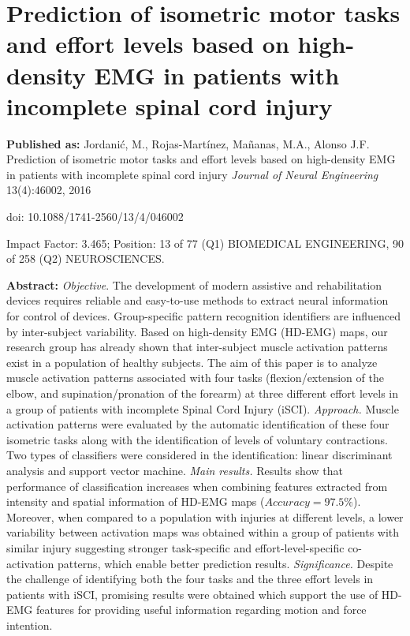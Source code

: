 \chapter[Myoelectric patterns within the group of patients with iSCI]{Prediction of isometric motor tasks and effort levels based on high-density EMG in patients with incomplete spinal cord injury}
\label{ch:p2}
\textbf{Published as:} 
Jordanić, M., Rojas-Martínez,  Ma\~nanas, M.A., Alonso J.F.
Prediction of isometric motor tasks and effort levels based on high-density EMG in patients with incomplete spinal cord injury \textit{Journal of Neural Engineering} 13(4):46002, 2016

doi: 10.1088/1741-2560/13/4/046002

Impact Factor: 3.465; Position: 13 of 77 (Q1) BIOMEDICAL ENGINEERING, 90 of 258 (Q2) NEUROSCIENCES.


\textbf{Abstract:} \textit{Objective}. The development of modern assistive and rehabilitation devices requires reliable and easy-to-use methods to extract neural information for control of devices. Group-specific pattern recognition identifiers are influenced by inter-subject variability. Based on high-density EMG (HD-EMG) maps, our research group has already shown that inter-subject muscle activation patterns exist in a population of healthy subjects. The aim of this paper is to analyze muscle activation patterns associated with four tasks (flexion/extension of the elbow, and supination/pronation of the forearm) at three different effort levels in a group of patients with incomplete Spinal Cord Injury (iSCI). \textit{Approach.} Muscle activation patterns were evaluated by the automatic identification of these four isometric tasks along with the identification of levels of voluntary contractions. Two types of classifiers were considered in the identification: linear discriminant analysis and support vector machine. \textit{Main results.} Results show that performance of classification increases when combining features extracted from intensity and spatial information of HD-EMG maps ($Accuracy = 97.5\%$). Moreover, when compared to a population with injuries at different levels, a lower variability between activation maps was obtained within a group of patients with similar injury suggesting stronger task-specific and effort-level-specific co-activation patterns, which enable better prediction results. \textit{Significance.} Despite the challenge of identifying both the four tasks and the three effort levels in patients with iSCI, promising results were obtained which support the use of HD-EMG features for providing useful information regarding motion and force intention.

